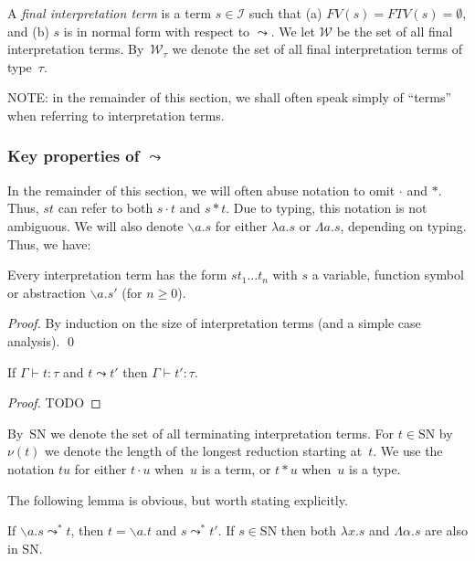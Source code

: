 \documentclass[runningheads,a4paper]{llncs}
\newcommand{\Iterms}{\mathcal{I}}
\newcommand{\World}{\mathcal{W}}
\newcommand{\abs}[2]{\lambda #1.#2}
\newcommand{\tabs}[2]{\Lambda #1.#2}
\newcommand{\abstraction}[2]{\backslash #1.#2}
\newcommand{\app}[2]{#1 \cdot #2}
\newcommand{\tapp}[2]{#1 * #2}
\newcommand{\FTV}{\mathit{FTV}}
\newcommand{\FV}{\mathit{FV}}
\newcommand{\SN}{\mathrm{SN}}
\begin{document}
\begin{definition}
A \emph{final interpretation term} is a term $s \in \Iterms$ such that
(a) $\FV(s) = \FTV(s) = \emptyset$, and (b) $s$ is in normal form with
respect to $\leadsto$.  We let $\World$ be the set of all final
interpretation terms. By~$\World_\tau$ we denote the set of all final
interpretation terms of type~$\tau$.
\end{definition}

NOTE: in the remainder of this section, we shall often speak simply of
``terms'' when referring to interpretation terms.

\subsubsection{Key properties of $\leadsto$}
In the remainder of this section, we will often abuse notation to omit
$\cdot$ and $*$.  Thus, $s t$ can refer to both $\app{s}{t}$ and
$\tapp{s}{t}$.  Due to typing, this notation is not ambiguous.  We will
also denote $\abstraction{a}{s}$ for either $\abs{a}{s}$ or
$\tabs{a}{s}$, depending on typing. Thus, we have:

\begin{lemma}\label{lem_abusive_notation}
Every interpretation term has the form $s t_1 \dots t_n$ with
$s$ a variable, function symbol or abstraction $\abstraction{a}{s'}$
(for $n \geq 0$).
\end{lemma}

\begin{proof}
By induction on the size of interpretation terms (and a simple case
analysis).
\qed
\end{proof}

\begin{lemma}
  If $\Gamma \vdash t : \tau$ and $t \leadsto t'$ then
  $\Gamma \vdash t' : \tau$.
\end{lemma}

\begin{proof}
  TODO
\end{proof}

By~$\SN$ we denote the set of all terminating interpretation
terms. For $t \in \SN$ by~$\nu(t)$ we denote the length of the longest
reduction starting at~$t$. We use the notation $t u$ for either
$\app{t}{u}$ when~$u$ is a term, or $\tapp{t}{u}$ when~$u$ is a type.

The following lemma is obvious, but worth stating explicitly.

\begin{lemma}\label{lem_reduce_abs}
If $\abstraction{a}{s} \leadsto^* t$, then $t = \abstraction{a}{
t}$ and $s \leadsto^* t'$.
If $s \in \SN$ then both $\abs{x}{s}$ and $\tabs{\alpha}{s}$ are also
in $\SN$.
\end{lemma}
\end{document}
